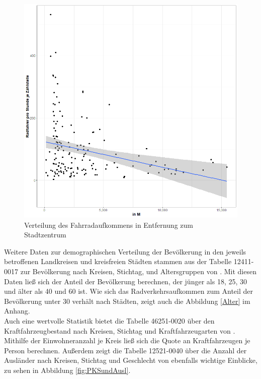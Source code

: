 \documentclass[a4paper,12pt]{thesis}
\begin{document}
\begin{figure}[!ht]
	\centering
	\includegraphics[width=\textwidth]{Plots/plot11.png}
	\caption{Verteilung des Fahrradaufkommens in Entfernung zum Stadtzentrum}
	\label{Stadtzentrum}
\end{figure}

Weitere Daten zur demographischen Verteilung der Bevölkerung in den jeweils betroffenen Landkreisen und kreisfreien Städten stammen aus der Tabelle 12411-0017 zur Bevölkerung nach Kreisen, Stichtag, und Altersgruppen von \cite{Destatis2022_a}. Mit diesen Daten ließ sich der Anteil der Bevölkerung berechnen, der jünger als 18, 25, 30 und älter als 40 und 60 ist. Wie sich das Radverkehrsaufkommen zum Anteil der Bevölkerung unter 30 verhält nach Städten, zeigt auch die Abbildung \ref{Alter} im Anhang.\\

Auch eine wertvolle Statistik bietet die Tabelle 46251-0020 über den Kraftfahrzeugbestand nach Kreisen, Stichtag und Kraftfahrzeugarten von \cite{Destatis2022b}. Mithilfe der Einwohneranzahl je Kreis ließ sich die Quote an Kraftfahrzeugen je Person berechnen. Außerdem zeigt die Tabelle 12521-0040 über die Anzahl der Ausländer nach Kreisen, Stichtag und Geschlecht von \cite{Destatis2022c} ebenfalls wichtige Einblicke, zu sehen in Abbildung \ref{fig:PKSundAusl}.
\end{document}
